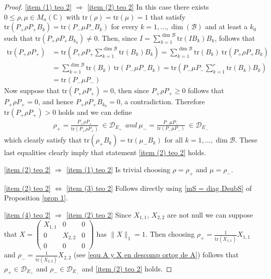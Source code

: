 \documentclass[12pt,a4paper]{article}
\def\calB{\mathcal B}
\def\calD{\mathcal D}
\def\C{\mathbb C}
\def\tr{\text{tr}}
\numberwithin{equation}{section}
\begin{document}
\begin{proof}
	\ref{item (1) teo 2} $\Rightarrow$ \ref{item (2) teo 2}  In this case there exists  $0\leq\rho, \mu\in M_n(\C)$ with $\tr(\rho)=\tr(\mu)=1$ that satisfy $\tr(P_+\rho P_+ B_k )=\tr(P_-\mu P_- B_k ) $ for every $k=1,\dots, \dim(\calB)$ and at least a $k_0$ such that $\tr(P_+\rho P_+ B_{k_0})\neq 0$. 
	Then, since $I=\sum_{k=1}^{\dim \calB} \tr(I B_k ) B_k$, follows that 
	\begin{equation*}
	\begin{split}
	  \tr(P_+\rho P_+ )&= \tr\left(P_+\rho P_+  \sum_{k=1}^{\dim \calB} \tr(B_k ) B_k\right)=\sum_{k=1}^{\dim \calB} \tr(B_k )\ \tr\left(P_+\rho P_+   B_k\right)\\
	&=\sum_{k=1}^{\dim \calB} \tr(B_k )\ \tr\left(P_-\mu P_-   B_k\right)=
	 \tr\left(P_-\mu P_-  \sum_{k=1}^r \tr(B_k ) B_k\right)\\
	 &=\tr\left(P_-\mu P_- \right)
	\end{split}
	\end{equation*}
	Now suppose that $\tr\left(P_+\rho P_+\right)=0$, then since $P_+\rho P_+\geq 0$ follows that $P_+\rho P_+=0$, and hence $P_+\rho P_+B_{k_0}=0$, a contradiction. Therefore $\tr\left(P_+\rho P_+\right)>0$ holds and we can define
	\begin{equation*}
		\begin{split}
			\rho_+ =\frac{P_+\rho P_+}{\tr\left(P_+\rho P_+\right)}\ \in \calD_{E_+}\ \ and \  
			\mu_- =\frac{P_-\mu P_-}{\tr\left(P_-\mu P_-\right)}\ \in \calD_{E_-}
		\end{split}
	\end{equation*}
	which clearly satisfy that $\tr(\rho_+  B_k )=\tr(\mu_-B_k)$ for all $k=1,\dots,\dim\calB$. These last equalities clearly imply that statement \ref{item (2) teo 2} holds.
	
 \medspace
 
 	\ref{item (2) teo 2} $\Rightarrow$ \ref{item (1) teo 2} Is trivial choosing $\rho=\rho_+$ and $\mu=\rho_-$.
 
 \medspace

\ref{item (2) teo 2} $\Leftrightarrow$ \ref{item (3) teo 2} Follows directly using \ref{mS = diag DsubS} of Proposition \ref{prop 1}.


 \medspace

\ref{item (4) teo 2} $\Rightarrow$ \ref{item (2) teo 2} Since $X_{1,1}$, $X_{2,2}$ are not null we can suppose that $X=\left(\begin{smallmatrix}
	X_{1,1}&0&0\\ 0&X_{2,2}&0\\0&0&0
\end{smallmatrix}\right)$ has $\|X\|_1=1$. Then choosing $\rho_+=\frac1{\tr(X_{1,1})} X_{1,1}$ and $\rho_-=\frac1{\tr(X_{2,2})} X_{2,2}$ (see \eqref{equ A y X en descomp ortog de A}) follows that $\rho_+\in\calD_{E_+}$ and $\rho_-\in\calD_{E_-}$ and \ref{item (2) teo 2} holds. 


\end{proof}
\end{document}

